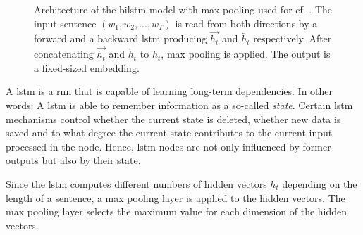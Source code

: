 \begin{figure}[!htb] %
    \centering
    
    \caption[Architecture of \infersent{}]{Architecture of the \ac{bilstm} model with max pooling used for \infersent{} cf. \cite{inferSent2018}.
    The input sentence $(w_1, w_2, ..., w_T)$ is read from both directions by a forward and a backward \ac{lstm} 
    producing $\overrightarrow{h_t}$ and $\overleftarrow{h_t}$ respectively.
    After concatenating $\overrightarrow{h_t}$ and $\overleftarrow{h_t}$ to $h_t$, max pooling is applied.
    The output is a fixed-sized embedding.
    }
    \label{fig:infersent_bilstm}
\end{figure}

A \ac{lstm} is a \ac{rnn} that is capable of learning long-term dependencies.
In other words: 
A \ac{lstm} is able to remember information as a so-called \textit{state}.
Certain \ac{lstm} mechanisms control whether the current state is deleted, whether new data is saved and 
to what degree the current state contributes to the current input processed in the node.
Hence, \ac{lstm} nodes are not only influenced by former outputs but also by their state.

Since the \ac{lstm} computes different numbers of hidden vectors $h_t$ depending on the length of a sentence, a max pooling layer is applied to the hidden vectors.
The max pooling layer selects the maximum value for each dimension of the hidden vectors.

